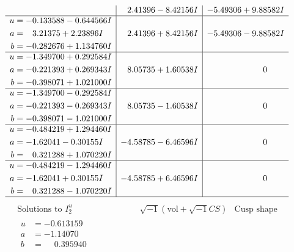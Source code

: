 \documentclass[1p]{elsarticle_modified}
\theoremstyle{definition}
\newcommand{\I}{\sqrt{-1}}
\begin{document}
$$\begin{array}{c|c|c}
 & \phantom{-}2.41396 - 8.42156 I & -5.49306 + 9.88582 I \\ \hline\begin{aligned}
u &= -0.133588 - 0.644566 I \\
a &= \phantom{-}3.21375 + 2.23896 I \\
b &= -0.282676 + 1.134760 I\end{aligned}
 & \phantom{-}2.41396 + 8.42156 I & -5.49306 - 9.88582 I \\ \hline\begin{aligned}
u &= -1.349700 + 0.292584 I \\
a &= -0.221393 + 0.269343 I \\
b &= -0.398071 + 1.021000 I\end{aligned}
 & \phantom{-}8.05735 + 1.60538 I & \phantom{-0.000000 } 0 \\ \hline\begin{aligned}
u &= -1.349700 - 0.292584 I \\
a &= -0.221393 - 0.269343 I \\
b &= -0.398071 - 1.021000 I\end{aligned}
 & \phantom{-}8.05735 - 1.60538 I & \phantom{-0.000000 } 0 \\ \hline\begin{aligned}
u &= -0.484219 + 1.294460 I \\
a &= -1.62041 - 0.30155 I \\
b &= \phantom{-}0.321288 + 1.070220 I\end{aligned}
 & -4.58785 - 6.46596 I & \phantom{-0.000000 } 0 \\ \hline\begin{aligned}
u &= -0.484219 - 1.294460 I \\
a &= -1.62041 + 0.30155 I \\
b &= \phantom{-}0.321288 - 1.070220 I\end{aligned}
 & -4.58785 + 6.46596 I & \phantom{-0.000000 } 0\\
 \hline 
 \end{array}$$\newpage$$\begin{array}{c|c|c}  
\text{Solutions to }I^u_{2}& \I (\text{vol} + \sqrt{-1}CS) & \text{Cusp shape}\\
 \hline 
\begin{aligned}
u &= -0.613159\phantom{ +0.000000I} \\
a &= -1.14070\phantom{ +0.000000I} \\
b &= \phantom{-}0.395940\phantom{ +0.000000I}\end{aligned}

\end{array}$$
\end{document}

